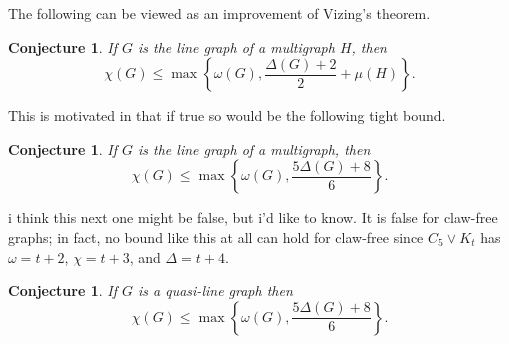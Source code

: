\documentclass[12pt]{article}
\theoremstyle{plain}
\newtheorem{conjecture}[thm]{Conjecture}
\theoremstyle{definition}
\theoremstyle{remark}
\begin{document}
The following can be viewed as an improvement of Vizing's theorem.

\begin{conjecture}
If $G$ is the line graph of a multigraph $H$, then
\[\chi(G) \leq  \max\left\{\omega(G), \frac{\Delta(G) + 2}{2} + \mu(H)\right\}.\]
\end{conjecture}

This is motivated in that if true so would be the following tight bound.

\begin{conjecture}\label{BestPossibleWithJustDelta}
If $G$ is the line graph of a multigraph, then
\[\chi(G) \leq \max\left\{\omega(G),\frac{5\Delta(G) + 8}{6}\right\}.\]
\end{conjecture}

i think this next one might be false, but i'd like to know.  It is false for claw-free graphs; in fact, no bound like this at all can hold for claw-free since $C_5 \vee K_t$ has $\omega = t + 2$, $\chi = t + 3$, and $\Delta = t + 4$.

\begin{conjecture}
If $G$ is a quasi-line graph then
\[\chi(G) \leq \max\left\{\omega(G),\frac{5\Delta(G) + 8}{6}\right\}.\]
\end{conjecture}
\end{document}
